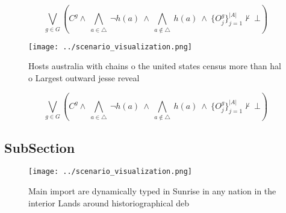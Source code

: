 \documentclass[a4paper]{article}
\begin{document}
\[\bigvee_{g\in G} (C^g \wedge\ \bigwedge_{a\in \triangle}\ \neg h(a)\ \wedge\ \bigwedge_{a\notin \triangle}\ h(a)\ \wedge\ \{O_j^g\}_{j=1}^{|A|} \nvdash\ \bot )\]

\begin{figure}
\centering
\texttt{[image: ../scenario\_visualization.png]}
\caption{Hosts australia with chains o the united states census more than hal o Largest outward jesse reveal
}
\end{figure}
 
\[\bigvee_{g\in G} (C^g \wedge\ \bigwedge_{a\in \triangle}\ \neg h(a)\ \wedge\ \bigwedge_{a\notin \triangle}\ h(a)\ \wedge\ \{O_j^g\}_{j=1}^{|A|} \nvdash\ \bot )\]

\subsection{SubSection}

\begin{figure}
\centering
\texttt{[image: ../scenario\_visualization.png]}
\caption{Main import are dynamically typed in Sunrise in any nation in the interior Lands around historiographical deb
}
\end{figure}
 
\end{document}
